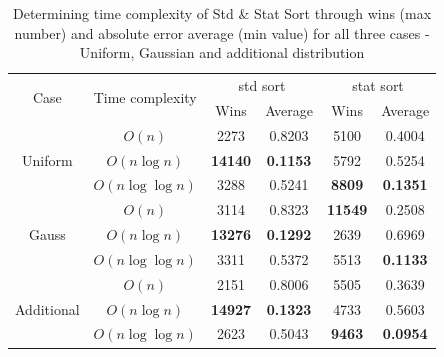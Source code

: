\documentclass[12pt]{article}
\begin{document}
		\begin{table}
		\caption{Determining time complexity of Std \& Stat Sort through wins (max number) and absolute error average (min value) for all three cases - Uniform, Gaussian and additional distribution}
		\begin{center}
		\begin{tabular}{ |c|c|c|c|c|c| }
		\hline
        \multirow{2}{*}{Case} & \multirow{2}{*}{Time complexity} & \multicolumn{2}{|c|}{std sort} & \multicolumn{2}{|c|}{stat sort} \\
        
		 &  & Wins & Average & Wins & Average \\

		\hline\hline
		
		\multirow{3}{*}{Uniform} & $O(n)$ & 2273  & 0.8203 & 5100 & 0.4004 \\
	     & $O(n \log n)$ & \textbf{14140} & \textbf{0.1153} & 5792 & 0.5254\\
          & $O(n \log \log n)$ & 3288 & 0.5241 & \textbf{8809} & \textbf{0.1351}\\

        \hline\hline

		\multirow{3}{*}{Gauss} & $O(n)$ & 3114 & 0.8323 & \textbf{11549} & 0.2508 \\
		 & $O(n \log n)$ & \textbf{13276} & \textbf{0.1292} & 2639 & 0.6969 \\        
         & $O(n \log \log n)$ & 3311 & 0.5372 & 5513 & \textbf{0.1133} \\

        \hline\hline

		\multirow{3}{*}{Additional} & $O(n)$ & 2151 & 0.8006 & 5505 & 0.3639  \\
		 & $O(n \log n)$ & \textbf{14927} & \textbf{0.1323} & 4733 & 0.5603 \\
         & $O(n \log \log n)$ & 2623 & 0.5043 & \textbf{9463} & \textbf{0.0954} \\        

		\hline
		\end{tabular}
		\end{center}
		\label{table3}
		\end{table}
\end{document}
